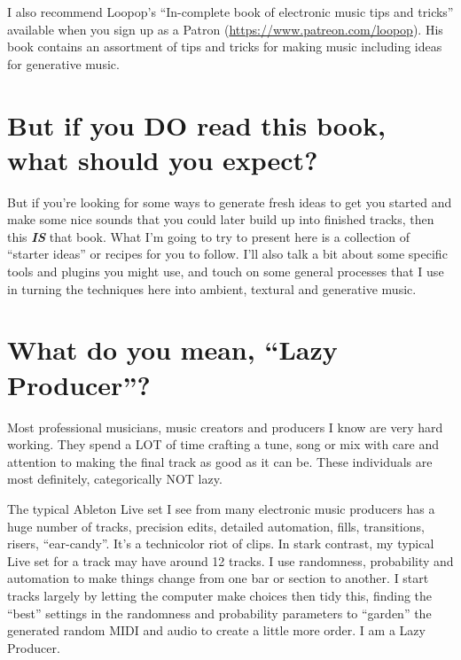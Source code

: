 \documentclass[
  12pt,
  letterpaper,
  oneside,
  open=any]{scrbook}
\begin{document}
I also recommend Loopop's ``In-complete book of electronic music tips
and tricks'' available when you sign up as a Patron
(\url{https://www.patreon.com/loopop}). His book contains an assortment
of tips and tricks for making music including ideas for generative
music.

\section*{But if you DO read this book, what should you
expect?}\label{but-if-you-do-read-this-book-what-should-you-expect}


But if you're looking for some ways to generate fresh ideas to get you
started and make some nice sounds that you could later build up into
finished tracks, then this \textbf{\emph{IS}} that book. What I'm going
to try to present here is a collection of ``starter ideas'' or recipes
for you to follow. I'll also talk a bit about some specific tools and
plugins you might use, and touch on some general processes that I use in
turning the techniques here into ambient, textural and generative music.

\section*{What do you mean, ``Lazy
Producer''?}\label{what-do-you-mean-lazy-producer}


Most professional musicians, music creators and producers I know are
very hard working. They spend a LOT of time crafting a tune, song or mix
with care and attention to making the final track as good as it can be.
These individuals are most definitely, categorically NOT lazy.

The typical Ableton Live set I see from many electronic music producers
has a huge number of tracks, precision edits, detailed automation,
fills, transitions, risers, ``ear-candy''. It's a technicolor riot of
clips. In stark contrast, my typical Live set for a track may have
around 12 tracks. I use randomness, probability and automation to make
things change from one bar or section to another. I start tracks largely
by letting the computer make choices then tidy this, finding the
``best'' settings in the randomness and probability parameters to
``garden'' the generated random MIDI and audio to create a little more
order. I am a Lazy Producer.
\end{document}
